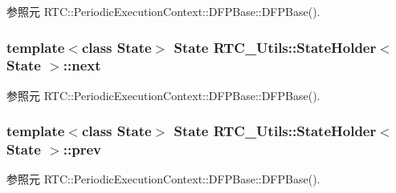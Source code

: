参照元 RTC::PeriodicExecutionContext::DFPBase::DFPBase().

\subsubsection[{next}]{\setlength{\rightskip}{0pt plus 5cm}template$<$class State$>$ State {\bf RTC\_\-Utils::StateHolder}$<$ State $>$::{\bf next}}\label{structRTC__Utils_1_1StateHolder_af7c8270e02be5f1575d4982115149713}


参照元 RTC::PeriodicExecutionContext::DFPBase::DFPBase().

\subsubsection[{prev}]{\setlength{\rightskip}{0pt plus 5cm}template$<$class State$>$ State {\bf RTC\_\-Utils::StateHolder}$<$ State $>$::{\bf prev}}\label{structRTC__Utils_1_1StateHolder_a8e1e247158f889059ba84d6428a4fd35}


参照元 RTC::PeriodicExecutionContext::DFPBase::DFPBase().

